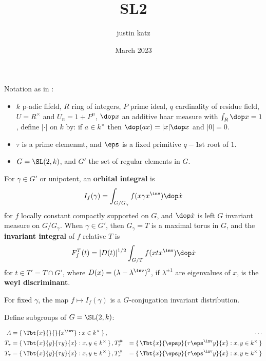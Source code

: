 \documentclass{article}
\title{SL2}
\author{justin katz}
\date{March 2023}
\begin{document}
Notation as in \cite{sallyFourierTransformOrbital1983}:
\begin{itemize}
    \item $k$ p-adic fifeld, $R$ ring of integers, $P$ prime ideal, $q$ cardinality of residue field, $U = R^\times$ and $U_n = 1 + P^n$, $\dop x$ an additive haar measure with $\int_R \dop x =1$, define $|\cdot|$ on $k$ by: if $a\in k^\times$ then $\dop(ax) = |x| \dop x$ and $|0|=0$. 
    \item $\tau$ is a prime elemenmt, and $\eps$ is a fixed primitive $q-1$st root of $1$. 
    \item $G = \SL(2,k)$, and $G'$ the set of regular elements in $G$. 
\end{itemize}

For $\gamma \in G'$ or unipotent, an \textbf{orbital integral} is
\begin{align*}
    I_f(\gamma) = \int_{G/G_\gamma}f(x \gamma x^\inv)\dop \dot{x} 
\end{align*}
for $f$ locally constant compactly supported on $G$, and $\dop \dot{x}$ is left $G$ invariant measure on $G/G_\gamma$. When $\gamma \in G'$, then $G_\gamma =T$ is a maximal torus in $G$, and the \textbf{invariant integral} of $f$ relative $T$ is 
\begin{align*}
    F_f^T(t) = |D(t)|^{1/2} \int_{G/T} f(xtx^\inv)\dop \dot{x}
\end{align*}
for $t\in T' = T\cap G'$, where $D(x) = (\lambda-\lambda^\inv)^2$, if $\lambda^{\pm 1}$ are eigenvalues of $x$, is the \textbf{weyl discriminant}. 

For fixed $\gamma$, the map $f\mapsto I_f(\gamma)$ is a $G$-conjugation invariant distribution. 

Define subgroups of $G=\SL(2,k)$:

\begin{align*}
    A &= \set{\Tbt{x}{}{}{x^\inv}: x \in k^\times},\quad& \cdots   \\
    T_\tau &= \set{\Tbt{x}{y}{\tau y}{x}: x,y \in k^\times},   T_\tau^\# &= \set{\Tbt{x}{\eps y}{\tau\eps^\inv y}{x}: x,y \in k^\times} \\
    T_\tau &= \set{\Tbt{x}{y}{\tau y}{x}: x,y \in k^\times}, T_\tau^\# &= \set{\Tbt{x}{\eps y}{\tau\eps^\inv y}{x}: x,y \in k^\times} 
\end{align*}




\end{document}
